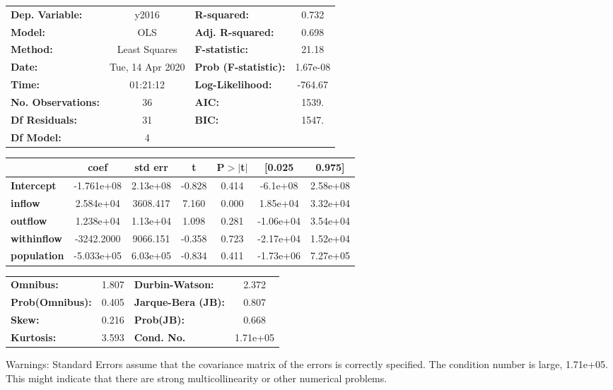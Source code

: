 \begin{center}
\begin{tabular}{lclc}
\toprule
\textbf{Dep. Variable:}    &      y2016       & \textbf{  R-squared:         } &     0.732   \\
\textbf{Model:}            &       OLS        & \textbf{  Adj. R-squared:    } &     0.698   \\
\textbf{Method:}           &  Least Squares   & \textbf{  F-statistic:       } &     21.18   \\
\textbf{Date:}             & Tue, 14 Apr 2020 & \textbf{  Prob (F-statistic):} &  1.67e-08   \\
\textbf{Time:}             &     01:21:12     & \textbf{  Log-Likelihood:    } &   -764.67   \\
\textbf{No. Observations:} &          36      & \textbf{  AIC:               } &     1539.   \\
\textbf{Df Residuals:}     &          31      & \textbf{  BIC:               } &     1547.   \\
\textbf{Df Model:}         &           4      & \textbf{                     } &             \\
\bottomrule
\end{tabular}
\begin{tabular}{lcccccc}
                    & \textbf{coef} & \textbf{std err} & \textbf{t} & \textbf{P$> |$t$|$} & \textbf{[0.025} & \textbf{0.975]}  \\
\midrule
\textbf{Intercept}  &   -1.761e+08  &     2.13e+08     &    -0.828  &         0.414        &     -6.1e+08    &     2.58e+08     \\
\textbf{inflow}     &    2.584e+04  &     3608.417     &     7.160  &         0.000        &     1.85e+04    &     3.32e+04     \\
\textbf{outflow}    &    1.238e+04  &     1.13e+04     &     1.098  &         0.281        &    -1.06e+04    &     3.54e+04     \\
\textbf{withinflow} &   -3242.2000  &     9066.151     &    -0.358  &         0.723        &    -2.17e+04    &     1.52e+04     \\
\textbf{population} &   -5.033e+05  &     6.03e+05     &    -0.834  &         0.411        &    -1.73e+06    &     7.27e+05     \\
\bottomrule
\end{tabular}
\begin{tabular}{lclc}
\textbf{Omnibus:}       &  1.807 & \textbf{  Durbin-Watson:     } &    2.372  \\
\textbf{Prob(Omnibus):} &  0.405 & \textbf{  Jarque-Bera (JB):  } &    0.807  \\
\textbf{Skew:}          &  0.216 & \textbf{  Prob(JB):          } &    0.668  \\
\textbf{Kurtosis:}      &  3.593 & \textbf{  Cond. No.          } & 1.71e+05  \\
\bottomrule
\end{tabular}
\end{center}

Warnings: \newline
 [1] Standard Errors assume that the covariance matrix of the errors is correctly specified. \newline
 [2] The condition number is large, 1.71e+05. This might indicate that there are \newline
 strong multicollinearity or other numerical problems.